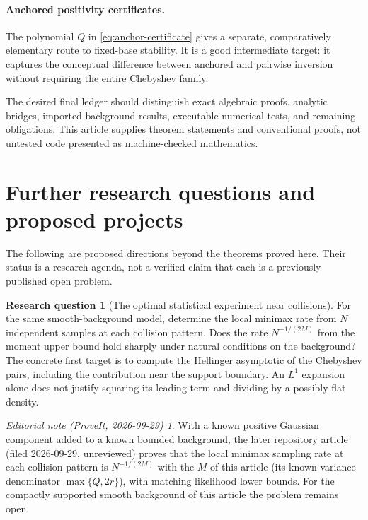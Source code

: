 \documentclass[11pt,a4paper]{article}
\numberwithin{equation}{section}
\theoremstyle{definition}
\newtheorem{problem}[problem]{Research question}
\theoremstyle{remark}
\newtheorem*{ednote}{Editorial note (ProveIt, 2026-09-29)}
\begin{document}
\paragraph{Anchored positivity certificates.}
The polynomial $Q$ in \eqref{eq:anchor-certificate} gives a separate, comparatively
elementary route to fixed-base stability.  It is a good intermediate target:
it captures the conceptual difference between anchored and pairwise inversion
without requiring the entire Chebyshev family.

The desired final ledger should distinguish exact algebraic proofs, analytic
bridges, imported background results, executable numerical tests, and remaining
obligations.  This article supplies theorem statements and conventional proofs,
not untested code presented as machine-checked mathematics.

\section{Further research questions and proposed projects}
\label{sec:questions}

The following are proposed directions beyond the theorems proved here.  Their
status is a research agenda, not a verified claim that each is a previously
published open problem.

\begin{problem}[The optimal statistical experiment near collisions]
For the same smooth-background model, determine the local minimax rate from
$N$ independent samples at each collision pattern.  Does the rate
$N^{-1/(2M)}$ from the moment upper bound hold sharply under natural conditions
on the background?  The concrete first target is to compute the Hellinger
asymptotic of the Chebyshev pairs, including the contribution near the support
boundary.  An $L^1$ expansion alone does not justify squaring its leading term
and dividing by a possibly flat density.
\end{problem}
\begin{ednote}
With a known positive Gaussian component added to a known bounded
background, the later repository article  (filed 2026-09-29,
unreviewed) proves that the local minimax sampling rate at each collision
pattern is $N^{-1/(2M)}$ with the $M$ of this article (its known-variance
denominator $\max\{Q,2r\}$), with matching likelihood lower bounds. For
the compactly supported smooth background of this article the problem
remains open.
\end{ednote}
\end{document}

